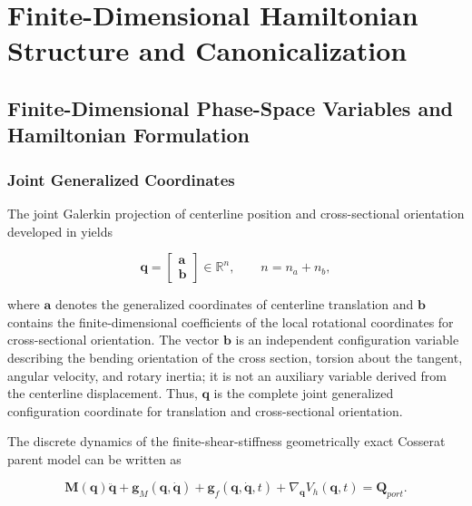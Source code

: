 \section{Finite-Dimensional Hamiltonian Structure and Canonicalization}\label{sec:hamiltonian-structure}

\subsection{Finite-Dimensional Phase-Space Variables and Hamiltonian Formulation}\label{sec:hamiltonian-3-1}

\subsubsection{Joint Generalized Coordinates}\label{sec:hamiltonian-3-1-1}

The joint Galerkin projection of centerline position and cross-sectional orientation developed in  yields

\begin{equation}
\label{eq:hamiltonian-3-1}
\boxed{\mathbf{q} = \begin{bmatrix}
\mathbf{a} \\
\mathbf{b}
\end{bmatrix} \in \mathbb{R}^{n},\quad\quad n = n_{a} + n_{b},}
\end{equation}

where \(\mathbf{a}\) denotes the generalized coordinates of centerline translation and \(\mathbf{b}\) contains the finite-dimensional coefficients of the local rotational coordinates for cross-sectional orientation. The vector \(\mathbf{b}\) is an independent configuration variable describing the bending orientation of the cross section, torsion about the tangent, angular velocity, and rotary inertia; it is not an auxiliary variable derived from the centerline displacement. Thus, \(\mathbf{q}\) is the complete joint generalized configuration coordinate for translation and cross-sectional orientation.

The discrete dynamics of the finite-shear-stiffness geometrically exact Cosserat parent model can be written as

\begin{equation}
\label{eq:hamiltonian-3-2}
\boxed{\mathbf{M}\left( \mathbf{q} \right)\ddot{\mathbf{q}} + \mathbf{g}_{M}\left( \mathbf{q},\dot{\mathbf{q}} \right) + \mathbf{g}_{f}\left( \mathbf{q},\dot{\mathbf{q}},t \right) + \nabla_{\mathbf{q}}V_{h}\left( \mathbf{q},t \right) = \mathbf{Q}_{port}.}
\end{equation}

